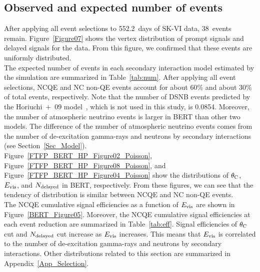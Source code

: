 \subsection{Observed and expected number of events}
\vs\hs
After applying all event selections to 552.2~days of SK-VI data, 38~events remain.
Figure~\ref{Figure07} shows the vertex distribution of prompt signals and delayed signals for the data.
From this figure, we confirmed that these events are uniformly distributed.\\
\hs
The expected number of events in each secondary interaction model estimated by the simulation are summarized in Table~\ref{tab:num}.
After applying all event selections, NCQE and NC non-QE events account for about 60\% and about 30\% of total events, respectively.
Note that the number of DSNB events predicted by the Horiuchi~$+$~09 model~\cite{2009Horiuchi}, which is not used in this study, is 0.0854.
Moreover, the number of atmospheric neutrino events is larger in BERT than other two models.
The difference of the number of atmospheric neutrino events comes from the number of de-excitation gamma-rays and neutrons by secondary interactions (see Section~\ref{Sec_Model}).\\
\hs
Figure~\ref{FTFP_BERT_HP_Figure02_Poisson}, Figure~\ref{FTFP_BERT_HP_Figure08_Poisson}, and Figure~\ref{FTFP_BERT_HP_Figure04_Poisson} show the distributions of $\theta_{\rm C}$, $E_{\rm vis}$, and $N_{\rm delayed}$ in BERT, respectively.
From these figures, we can see that the tendency of distribution is similar between NCQE and NC non-QE events.
\\
\hs
The NCQE cumulative signal efficiencies as a function of $E_{\rm vis}$ are shown in Figure~\ref{BERT_Figure05}.
Moreover, the NCQE cumulative signal efficiencies at each event reduction are summarized in Table~\ref{tab:eff}.
Signal efficiencies of $\theta_{\rm C}$ cut and $N_{\rm delayed}$ cut increase as $E_{\rm vis}$ increases.
This means that $E_{\rm vis}$ is correlated to the number of de-excitation gamma-rays and neutrons by secondary interactions.
Other distributions related to this section are summarized in Appendix~\ref{App_Selection}.

